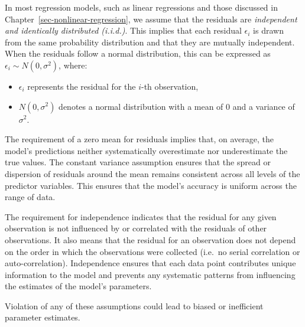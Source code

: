 \documentclass[
  letterpaper,
]{book}
\providecommand{\tightlist}{%
  \setlength{\itemsep}{0pt}\setlength{\parskip}{0pt}}\usepackage{longtable,booktabs,array}
\begin{document}
\begin{tcolorbox}[enhanced jigsaw, opacitybacktitle=0.6, toptitle=1mm, colframe=quarto-callout-note-color-frame, arc=.35mm, left=2mm, rightrule=.15mm, coltitle=black, opacityback=0, bottomrule=.15mm, bottomtitle=1mm, title=\textcolor{quarto-callout-note-color}{\faInfo}\hspace{0.5em}{The residuals, \(\epsilon_i\)}, toprule=.15mm, colbacktitle=quarto-callout-note-color!10!white, titlerule=0mm, leftrule=.75mm, colback=white, breakable]

In most regression models, such as linear regressions and those
discussed in Chapter~\ref{sec-nonlinear-regression}, we assume that the
residuals are \emph{independent and identically distributed (i.i.d.)}.
This implies that each residual \(\epsilon_i\) is drawn from the same
probability distribution and that they are mutually independent. When
the residuals follow a normal distribution, this can be expressed as
\(\epsilon_i \sim N(0, \sigma^2)\), where:

\begin{itemize}
\tightlist
\item
  \(\epsilon_i\) represents the residual for the \(i\)-th observation,
\item
  \(N(0, \sigma^2)\) denotes a normal distribution with a mean of 0 and
  a variance of \(\sigma^2\).
\end{itemize}

The requirement of a zero mean for residuals implies that, on average,
the model's predictions neither systematically overestimate nor
underestimate the true values. The constant variance assumption ensures
that the spread or dispersion of residuals around the mean remains
consistent across all levels of the predictor variables. This ensures
that the model's accuracy is uniform across the range of data.

The requirement for independence indicates that the residual for any
given observation is not influenced by or correlated with the residuals
of other observations. It also means that the residual for an
observation does not depend on the order in which the observations were
collected (i.e.~no serial correlation or auto-correlation). Independence
ensures that each data point contributes unique information to the model
and prevents any systematic patterns from influencing the estimates of
the model's parameters.

Violation of any of these assumptions could lead to biased or
inefficient parameter estimates.

\end{tcolorbox}
\end{document}
